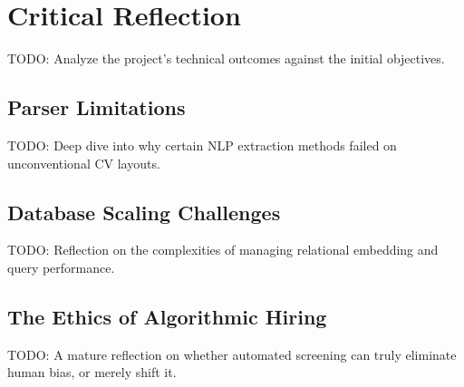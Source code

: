 \section{Critical Reflection}

TODO: Analyze the project's technical outcomes against the initial objectives.

\subsection{Parser Limitations}
TODO: Deep dive into why certain NLP extraction methods failed on unconventional CV layouts.

\subsection{Database Scaling Challenges}
TODO: Reflection on the complexities of managing relational embedding and query performance.

\subsection{The Ethics of Algorithmic Hiring}
TODO: A mature reflection on whether automated screening can truly eliminate human bias, or merely shift it.
